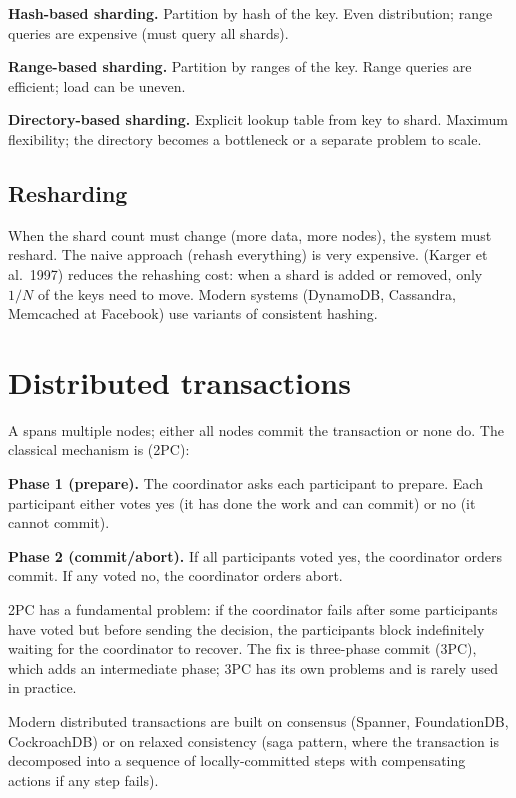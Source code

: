 \textbf{Hash-based sharding.} Partition by hash of the key. Even distribution; range queries are expensive (must query all shards).

\textbf{Range-based sharding.} Partition by ranges of the key. Range queries are efficient; load can be uneven.

\textbf{Directory-based sharding.} Explicit lookup table from key to shard. Maximum flexibility; the directory becomes a bottleneck or a separate problem to scale.

\subsection{Resharding}

When the shard count must change (more data, more nodes), the system must reshard. The naive approach (rehash everything) is very expensive.  (Karger et al.\ 1997) reduces the rehashing cost: when a shard is added or removed, only $1/N$ of the keys need to move. Modern systems (DynamoDB, Cassandra, Memcached at Facebook) use variants of consistent hashing.

\section{Distributed transactions}

A  spans multiple nodes; either all nodes commit the transaction or none do. The classical mechanism is  (2PC):

\textbf{Phase 1 (prepare).} The coordinator asks each participant to prepare. Each participant either votes yes (it has done the work and can commit) or no (it cannot commit).

\textbf{Phase 2 (commit/abort).} If all participants voted yes, the coordinator orders commit. If any voted no, the coordinator orders abort.

2PC has a fundamental problem: if the coordinator fails after some participants have voted but before sending the decision, the participants block indefinitely waiting for the coordinator to recover. The fix is three-phase commit (3PC), which adds an intermediate phase; 3PC has its own problems and is rarely used in practice.

Modern distributed transactions are built on consensus (Spanner, FoundationDB, CockroachDB) or on relaxed consistency (saga pattern, where the transaction is decomposed into a sequence of locally-committed steps with compensating actions if any step fails).


